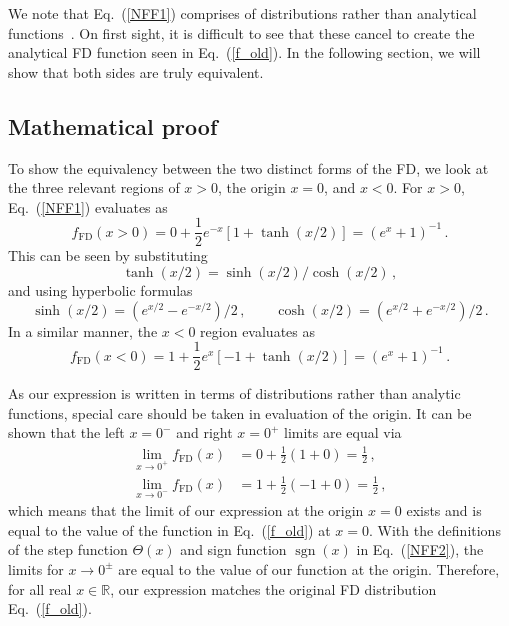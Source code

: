 \documentclass[sn-mathphys,Numbered]{sn-jnl}
\newcommand{\req}[1]{Eq.~(\ref{#1})}
\DeclareMathOperator{\sgn}{sgn}
\begin{document}
We note that \req{NFF1} comprises of distributions rather than analytical functions~\cite{Arfken:2011abc}. On first sight, it is difficult to see that these cancel to create the analytical FD function seen in \req{f_old}. In the following section, we will show that both sides are truly equivalent.

\subsection{Mathematical proof}
\label{Proof}
To show the equivalency between the two distinct forms of the FD, we look at the three relevant regions of $x>0$, the origin $x=0$, and $x<0$. For $x>0$, \req{NFF1} evaluates as
\begin{equation}
    f_\mathrm{FD}(x>0) = 0 + \frac{1}{2}e^{-x}[1+\tanh(x/2)] = (e^x + 1)^{-1}\,.
\end{equation}
This can be seen by substituting
\begin{equation}
    \tanh(x/2)=\sinh(x/2)/\cosh(x/2)\,,
\end{equation}
and using hyperbolic formulas
\begin{equation}
    \sinh(x/2)=(e^{x/2}-e^{-x/2})/2\,,\qquad
    \cosh(x/2) = (e^{x/2}+e^{-x/2})/2\,.
\end{equation}
In a similar manner, the $x<0$ region evaluates as
\begin{equation}
    f_\mathrm{FD}(x<0) = 1 + \frac{1}{2}e^{x}[-1 + \tanh(x/2)] = (e^x + 1)^{-1}\,.
\end{equation}

As our expression is written in terms of distributions rather than analytic functions, special care should be taken in evaluation of the origin. It can be shown that the left $x=0^{-}$ and right $x=0^{+}$ limits are equal via
\begin{align}
    \lim_{x\rightarrow 0^+} f_\mathrm{FD}(x) &= 0 + \frac{1}{2}(1 + 0) = \frac{1}{2}\,,\\
    \lim_{x\rightarrow 0^-} f_\mathrm{FD}(x) &= 1 + \frac{1}{2}(-1 + 0) = \frac{1}{2}\,,
\end{align}
which means that the limit of our expression at the origin $x=0$ exists and is equal to the value of the function in \req{f_old} at $x = 0$. With the definitions of the step function $\Theta(x)$ and sign function $\sgn(x)$ in \req{NFF2}, the limits for $x\rightarrow0^{\pm}$ are equal to the value of our function at the origin. Therefore, for all real $x\in\mathbb{R}$, our expression matches the original FD distribution \req{f_old}.
\end{document}
